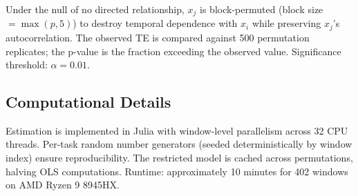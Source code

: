 \documentclass[12pt,letterpaper]{article}
\begin{document}
Under the null of no directed relationship, $x_j$ is block-permuted (block size $= \max(p,5)$) to destroy temporal dependence with $x_i$ while preserving $x_j$'s autocorrelation. The observed TE is compared against 500 permutation replicates; the p-value is the fraction exceeding the observed value. Significance threshold: $\alpha = 0.01$.

\subsection{Computational Details}

Estimation is implemented in Julia with window-level parallelism across 32 CPU threads. Per-task random number generators (seeded deterministically by window index) ensure reproducibility. The restricted model is cached across permutations, halving OLS computations. Runtime: approximately 10 minutes for 402 windows on AMD Ryzen 9 8945HX.
\end{document}
